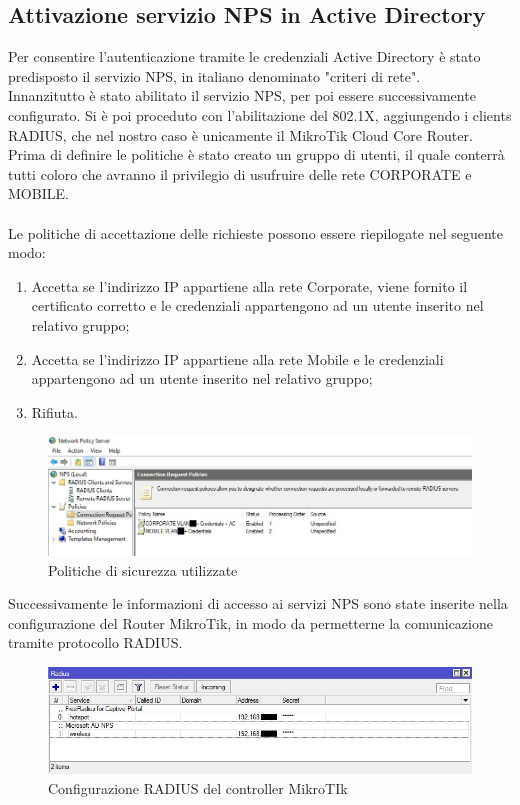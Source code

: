 \documentclass[Realizzazione.tex]{subfiles}
\begin{document}
\subsection{Attivazione servizio NPS in Active Directory} 
Per consentire l'autenticazione tramite le credenziali Active Directory è stato predisposto il servizio NPS, in italiano denominato "criteri di rete". \\
Innanzitutto è stato abilitato il servizio NPS, per poi essere successivamente configurato. Si è poi proceduto con l'abilitazione del 802.1X, aggiungendo i clients RADIUS, che nel nostro caso è unicamente il MikroTik Cloud Core Router.\\
Prima di definire le politiche è stato creato un gruppo di utenti, il quale conterrà tutti coloro che avranno il privilegio di usufruire delle rete CORPORATE e MOBILE. \\\\
Le politiche di accettazione delle richieste possono essere riepilogate nel seguente modo:
\begin{enumerate}
\item Accetta se l'indirizzo IP appartiene alla rete Corporate, viene fornito il certificato corretto e le credenziali appartengono ad un utente inserito nel relativo gruppo;
\item Accetta se l'indirizzo IP appartiene alla rete Mobile e le credenziali appartengono ad un utente inserito nel relativo gruppo;
\item Rifiuta.
\end{enumerate}

\begin{figure}[H]
	\centering
	\includegraphics[width=1\linewidth]{"images/nps_conf"}
	\caption{Politiche di sicurezza utilizzate}
	\label{fig:Politiche di sicurezza utilizzate}
\end{figure}


Successivamente le informazioni di accesso ai servizi NPS sono state inserite nella configurazione del Router MikroTik, in modo da permetterne la comunicazione tramite protocollo RADIUS.

\begin{figure}[H]
	\centering
	\includegraphics[width=1\linewidth]{"images/nps_miktorik"}
	\caption{Configurazione RADIUS del controller MikroTIk}
	\label{fig:Configurazione RADIUS del controller MikroTIk}
\end{figure}
\end{document}
